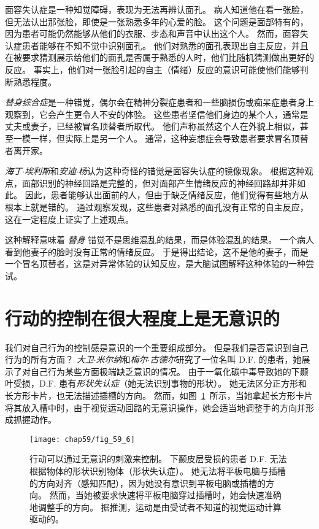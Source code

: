 面容失认症是一种知觉障碍，表现为无法再辨认面孔。
病人知道他在看一张脸，但无法认出那张脸，即使是一张熟悉多年的心爱的脸。
这个问题是面部特有的，因为患者可能仍然能够从他们的衣服、步态和声音中认出这个人。
然而，面容失认症患者能够在不知不觉中识别面孔。
他们对熟悉的面孔表现出自主反应，并且在被要求猜测展示给他们的面孔是否属于熟悉的人时，他们比随机猜测做出更好的反应。
事实上，他们对一张脸引起的自主（情绪）反应的意识可能使他们能够判断熟悉程度。


\textit{替身综合症}是一种错觉，偶尔会在精神分裂症患者和一些脑损伤或痴呆症患者身上观察到，它会产生更令人不安的体验。
这些患者坚信他们身边的某个人，通常是丈夫或妻子，已经被冒名顶替者所取代。
他们声称虽然这个人在外貌上相似，甚至一模一样，但实际上是另一个人。
通常，这种妄想症会导致患者要求冒名顶替者离开家。


\textit{海丁$\cdot$埃利斯}和\textit{安迪$\cdot$杨}认为这种奇怪的错觉是面容失认症的镜像现象。
根据这种观点，面部识别的神经回路是完整的，但对面部产生情绪反应的神经回路却并非如此。
因此，患者能够认出面前的人，但由于缺乏情绪反应，他们觉得有些地方从根本上就是错的。
通过观察发现，这些患者对熟悉的面孔没有正常的自主反应，这在一定程度上证实了上述观点。

这种解释意味着 \textit{替身} 错觉不是思维混乱的结果，而是体验混乱的结果。
一个病人看到他妻子的脸时没有正常的情绪反应。
于是得出结论，这不是他的妻子，而是一个冒名顶替者，这是对异常体验的认知反应，是大脑试图解释这种体验的一种尝试。


\section{行动的控制在很大程度上是无意识的}

我们对自己行为的控制感是意识的一个重要组成部分。
但是我们是否意识到自己行为的所有方面？
\textit{大卫$\cdot$米尔纳}和\textit{梅尔$\cdot$古德尔}研究了一位名叫 D.F. 的患者，她展示了对自己行为某些方面极端缺乏意识的情况。
由于一氧化碳中毒导致她的下颞叶受损，D.F. 患有\textit{形状失认症}（她无法识别事物的形状）。
她无法区分正方形和长方形卡片，也无法描述插槽的方向。
然而，如图~\ref{fig:59_6}~所示，当她拿起长方形卡片将其放入槽中时，由于视觉运动回路的无意识操作，她会适当地调整手的方向并形成抓握动作。


\begin{figure}[htbp]
	\centering
	\texttt{[image: chap59/fig\_59\_6]}
	\caption{行动可以通过无意识的刺激来控制。
		下颞皮层受损的患者 D.F. 无法根据物体的形状识别物体（形状失认症）。
		她无法将平板电脑与插槽的方向对齐（感知匹配），因为她没有意识到平板电脑或插槽的方向。
		然而，当她被要求快速将平板电脑穿过插槽时，她会快速准确地调整手的方向。
		据推测，运动是由受试者不知道的视觉运动计算驱动的\cite{milner2006visual}。}
	\label{fig:59_6}
\end{figure}


